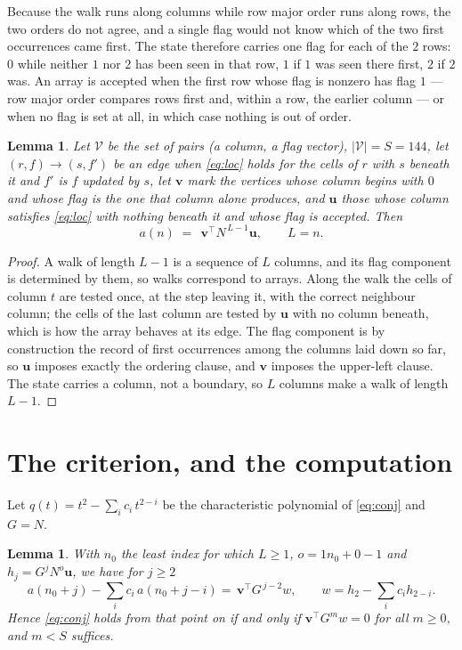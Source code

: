 \documentclass[11pt,a4paper]{article}
\theoremstyle{plain}
\newtheorem{lemma}[theorem]{Lemma}
\theoremstyle{definition}
\begin{document}
Because the walk runs along columns while row major order runs along
rows, the two orders do not agree, and a single flag would not know which of the two
first occurrences came first. The state therefore carries one flag for each of the $2$
rows: $0$ while neither $1$ nor $2$ has been seen in that row, $1$ if $1$
was seen there first, $2$ if $2$ was. An array is accepted when the first row whose
flag is nonzero has flag $1$ --- row major order compares rows first and, within a
row, the earlier column --- or when no flag is set at all, in which case nothing is out of
order.

\begin{lemma}\label{lem:walk}
Let $\mathcal V$ be the set of pairs (a column, a flag vector), $|\mathcal V|=S=144$, let
$(r,f)\to(s,f')$ be an edge when \eqref{eq:loc} holds for the cells of $r$ with $s$ beneath
it and $f'$ is $f$ updated by $s$, let $\mathbf{v}$ mark the vertices whose column begins
with $0$ and whose flag is the one that column alone produces, and $\mathbf{u}$ those whose
column satisfies \eqref{eq:loc} with nothing beneath it and whose flag is accepted. Then
\[
a(n)\;=\;\,\mathbf{v}^{\!\top}N^{\,L-1}\mathbf{u},\qquad L=n.
\]
\end{lemma}

\begin{proof}
A walk of length $L-1$ is a sequence of $L$ columns, and its flag component is determined by
them, so walks correspond to arrays. Along the walk the cells of column $t$ are tested once,
at the step leaving it, with the correct neighbour column; the cells of the last column are
tested by $\mathbf{u}$ with no column beneath, which is how the array behaves at its edge.
The flag component is by construction the record of first occurrences among the columns laid
down so far, so $\mathbf{u}$ imposes exactly the ordering clause, and $\mathbf{v}$ imposes
the upper-left clause. The state carries a column, not a boundary, so $L$ columns make a walk
of length $L-1$.
\end{proof}

\section{The criterion, and the computation}

Let $q(t)=t^{2}-\sum_i c_i\,t^{2-i}$ be the characteristic polynomial of
\eqref{eq:conj} and $G=N$.

\begin{lemma}\label{lem:crit}
With $n_0$ the least index for which $L\ge1$, $o=1n_0+0-1$ and
$h_j=G^{j}N^{o}\mathbf{u}$, we have for $j\ge2$
\[
a(n_0+j)-\sum_i c_i\,a(n_0+j-i)=\,\mathbf{v}^{\!\top}G^{\,j-2}w,
\qquad w=h_{2}-\sum_i c_ih_{2-i} .
\]
Hence \eqref{eq:conj} holds from that point on if and only if
$\mathbf{v}^{\!\top}G^{m}w=0$ for all $m\ge0$, and $m<S$ suffices.
\end{lemma}
\end{document}

